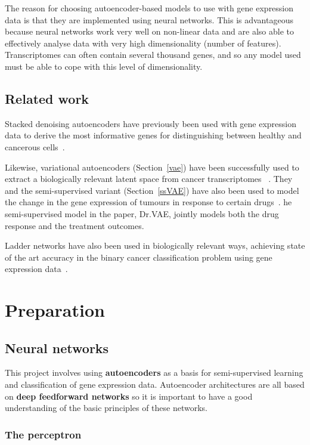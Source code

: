 \documentclass[12pt,a4paper,twoside,openright]{report}
\begin{document}
The reason for choosing autoencoder-based models to use with gene expression data is that they are implemented
using neural networks. This is advantageous because neural networks work very well on non-linear data and are
also able to effectively analyse data with very high dimensionality (number of features). Transcriptomes can
often contain several thousand genes, and so any model used must be able to cope with this level of dimensionality.

\section{Related work}

Stacked denoising autoencoders have previously been used with gene expression data to derive the most informative
genes for distinguishing between healthy and cancerous cells~\cite{8217828}.

Likewise, variational autoencoders (Section~\ref{vae}) have been successfully used to extract a biologically relevant latent 
space from cancer transcriptomes ~\cite{Way2018ExtractingAB}. They and the semi-supervised variant (Section~\ref{ssVAE}) 
have also been used to model the change in the gene expression of tumours in response to certain drugs~\cite{10.1093/bioinformatics/btz158}.
he semi-supervised model in the paper, Dr.VAE, jointly models both the drug response and the treatment outcomes.

Ladder networks have also been used in biologically relevant ways, achieving state of the art accuracy in the binary cancer classification
problem using gene expression data~\cite{10.1007/978-3-319-78723-7_23}.

\chapter{Preparation}

\section{Neural networks}

This project involves using \textbf{autoencoders} as a basis for semi-supervised learning and classification of gene expression data. 
Autoencoder architectures are all based on \textbf{deep feedforward networks} so it is important to have a good understanding of the basic principles
of these networks.

\subsection{The perceptron}
\end{document}
